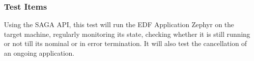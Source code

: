 





\subsubsection{Test Items}

Using the SAGA API, this test will run the EDF Application Zephyr on the
 target machine, regularly monitoring its state, checking whether it
 is still running or not till its nominal or in error termination. It
 will also test the cancellation of an ongoing application.

